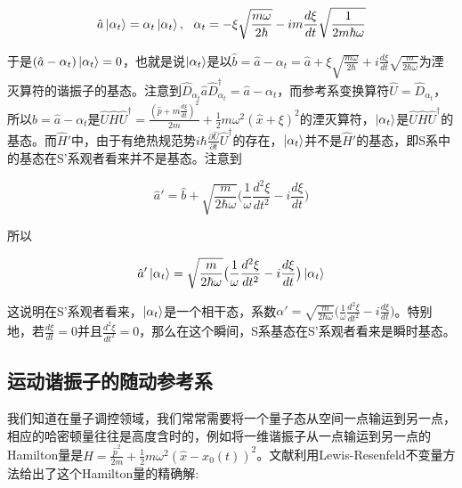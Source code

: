 \documentclass[a4paper]{article}
\begin{document}
        \begin{equation}
            \hat{a}\ket{\alpha_t}=\alpha_t\ket{\alpha_t},\ \ \alpha_t=-\xi\sqrt{\frac{m\omega}{2\hbar}}-im\frac{d\xi}{dt}\sqrt{\frac{1}{2m\hbar\omega}}
        \end{equation}

        于是$(\hat{a}-\alpha_t)\ket{\alpha_t}=0$，也就是说$\ket{\alpha_t}$是以$\hat{b}=\hat{a}-\alpha_t=\hat{a}+\xi\sqrt{\frac{m\omega}{2\hbar}}+i\frac{d\xi}{dt}\sqrt{\frac{m}{2\hbar\omega}}$为湮灭算符的谐振子的基态。注意到$\hat{D}_{\alpha_t}\hat{a}\hat{D}_{\alpha_t}^\dagger=\hat{a}-\alpha_t$，而参考系变换算符$\hat{U}=\hat{D}_{\alpha_t}$，所以$\hat{b}=\hat{a}-\alpha_t$是$\hat{U}\hat{H}\hat{U}^\dagger=\frac{(\hat{p}+m\frac{d\xi}{dt})^2}{2m}+\frac{1}{2}m\omega^2(\hat{x}+\xi)^2$的湮灭算符，$\ket{\alpha_t}$是$\hat{U}\hat{H}\hat{U}^\dagger$的基态。而$\hat{H}'$中，由于有绝热规范势$i\hbar\frac{\partial\hat{U}}{\partial t}\hat{U}^\dagger$的存在，$\ket{\alpha_t}$并不是$\hat{H}'$的基态，即S系中的基态在S'系观者看来并不是基态。注意到
        
        \begin{equation}
            \hat{a}'=\hat{b}+\sqrt{\frac{m}{2\hbar\omega}} \bigl(\frac{1}{\omega}\frac{d^2\xi}{dt^2}-i\frac{d\xi}{dt}\bigr)
        \end{equation}

        所以

        \begin{equation}
            \hat{a}'\ket{\alpha_t}=\sqrt{\frac{m}{2\hbar\omega}}\bigl(\frac{1}{\omega}\frac{d^2\xi}{dt^2}-i\frac{d\xi}{dt}\bigr)\ket{\alpha_t}
        \end{equation}

        这说明在S'系观者看来，$\ket{\alpha_t}$是一个相干态，系数$\alpha'=\sqrt{\frac{m}{2\hbar\omega}}\bigl(\frac{1}{\omega}\frac{d^2\xi}{dt^2}-i\frac{d\xi}{dt}\bigr)$。特别地，若$\frac{d\xi}{dt}=0$并且$\frac{d^2\xi}{dt^2}=0$，那么在这个瞬间，S系基态在S'系观者看来是瞬时基态。

    \subsection{运动谐振子的随动参考系}
        
        我们知道在量子调控领域，我们常常需要将一个量子态从空间一点输运到另一点，相应的哈密顿量往往是高度含时的，例如将一维谐振子从一点输运到另一点的Hamilton量是$\hat{H}=\frac{\hat{p}^2}{2m}+\frac{1}{2}m\omega^2(\hat{x}-x_0(t))^2$。文献\cite{bib:forteen}利用Lewis-Resenfeld不变量方法给出了这个Hamilton量的精确解:
\end{document}
